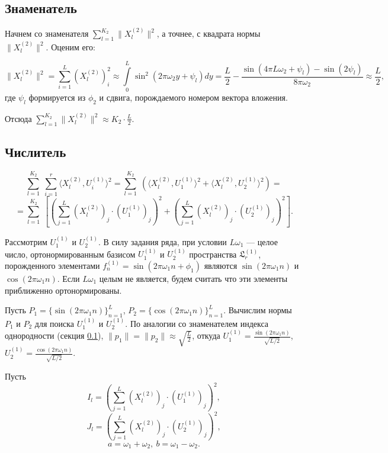 \documentclass[specialist, substylefile = spbu.rtx,
			   subf, href, 12pt]{disser}
\begin{document}
\subsection{Знаменатель}\label{sec:denominator}
Начнем со знаменателя $\sum\limits_{l=1}^{K_2}\|X_l^{(2)}\|^2$, а точнее, с квадрата нормы $\|X_l^{(2)}\|^2$. Оценим его:

$$ \|X_l^{(2)}\|^2 = \sum\limits_{i=1}^{L}(X_{l}^{(2)})_i^2 \approx \int\limits_{0}^{L}\sin^2{(2\pi\omega_2 y + \psi_l)}dy = \frac{L}{2} - \frac{\sin(4\pi L\omega_2 + \psi_l) - \sin(2\psi_l)}{8\pi\omega_2} \approx \frac{L}{2}, $$
где $ \psi_l $ формируется из $ \phi_2 $ и сдвига, порождаемого номером вектора вложения.

Отсюда $\sum\limits_{l=1}^{K_2}\|X_l^{(2)}\|^2 \approx K_2\cdot\frac{L}{2}$.


\subsection{Числитель}
$$ \sum\limits_{l=1}^{K_2}\;\sum\limits_{i=1}^{r}\langle X_l^{(2)}, U_i^{(1)}\rangle^2 = 
\sum\limits_{l=1}^{K_2}\;\left ( \langle X_l^{(2)}, U_1^{(1)}\rangle^2 + \langle X_l^{(2)}, U_2^{(1)}\rangle^2 \right ) = $$
$$ =  \sum\limits_{l=1}^{K_2}\; \left [ \left (\sum\limits_{j=1}^{L}(X_{l}^{(2)})_j\cdot (U_{1}^{(1)})_j\right )^2 + \left ( \sum\limits_{j=1}^{L}(X_{l}^{(2)})_j\cdot (U_{2}^{(1)})_j\right )^2 \right ].$$

Рассмотрим $ U_{1}^{(1)} $ и $U_{2}^{(1)} $. В силу задания ряда, при условии $ L\omega_1 $ --- целое число, ортонормированным базисом $ U_{1}^{(1)} $ и $U_{2}^{(1)} $ пространства $ \mathfrak{L}_r^{(1)} $, порожденного элементами $ f_n^{(1)} = \sin(2\pi\omega_1 n + \phi_1) $ являются $ \sin(2\pi\omega_1 n) $ и $ \cos(2\pi\omega_1 n) $. Если $ L\omega_1 $ целым не является, будем считать что эти элементы приближенно ортонормированы.

Пусть $ P_1 = \{\sin(2\pi\omega_1 n)\}_{n=1}^L $, $ P_2 = \{\cos(2\pi\omega_1 n)\}_{n=1}^L $. Вычислим нормы $ P_1 $ и $ P_2 $ для поиска $ U_{1}^{(1)} $ и $U_{2}^{(1)} $. 
По аналогии со знаменателем индекса однородности (секция \ref{sec:denominator}), $ \|p_1\| = \|p_2\| \approx \sqrt{\frac{L}{2}} $, откуда $ U_{1}^{(1)} = \frac{\sin(2\pi\omega_1 n)}{\sqrt{L/2}} $, $ U_{2}^{(1)} = \frac{\cos(2\pi\omega_1 n)}{\sqrt{L/2}} $.

Пусть  
$$ I_l =  \left (\sum\limits_{j=1}^{L}(X_{l}^{(2)})_j\cdot (U_{1}^{(1)})_j\right )^2, $$
$$ J_l =  \left (\sum\limits_{j=1}^{L}(X_{l}^{(2)})_j\cdot (U_{2}^{(1)})_j\right )^2, $$
$$ a = \omega_1 + \omega_2,\ b = \omega_1 - \omega_2. $$
\end{document}
